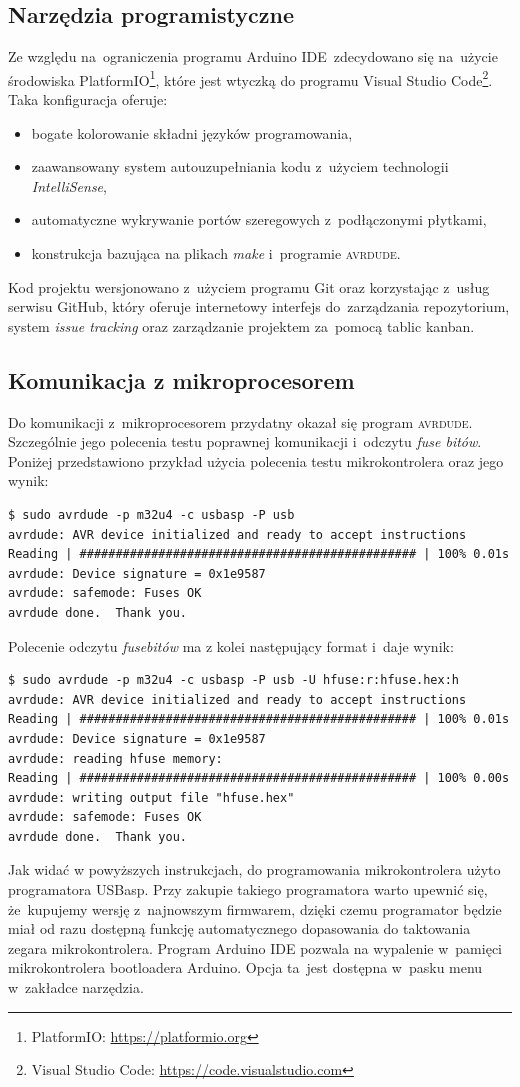\documentclass[11pt]{article}
\begin{document}
\subsection{Narzędzia programistyczne}
Ze względu na~ograniczenia programu Arduino IDE~zdecydowano się na~użycie środowiska PlatformIO\footnote{PlatformIO: \url{https://platformio.org}}, które jest wtyczką do programu Visual Studio Code\footnote{Visual Studio Code: \url{https://code.visualstudio.com}}. Taka konfiguracja oferuje:
\begin{itemize}
	\item bogate kolorowanie składni języków programowania,
	\item zaawansowany system autouzupełniania kodu z~użyciem technologii \textit{IntelliSense},
	\item automatyczne wykrywanie portów szeregowych z~podłączonymi płytkami,
	\item konstrukcja bazująca na plikach \textit{make} i~programie \textsc{avrdude}.
\end{itemize}
Kod projektu wersjonowano z~użyciem programu Git oraz korzystając z~usług serwisu GitHub, który oferuje internetowy interfejs do~zarządzania repozytorium, system \textit{issue tracking} oraz zarządzanie projektem za~pomocą tablic kanban.

\subsection{Komunikacja z mikroprocesorem}
Do komunikacji z~mikroprocesorem przydatny okazał się program \textsc{avrdude}.
Szczególnie jego polecenia testu poprawnej komunikacji i~odczytu \textit{fuse bitów}.
Poniżej przedstawiono przykład użycia polecenia testu mikrokontrolera oraz jego wynik:

\begin{verbatim}
$ sudo avrdude -p m32u4 -c usbasp -P usb
avrdude: AVR device initialized and ready to accept instructions
Reading | ############################################### | 100% 0.01s
avrdude: Device signature = 0x1e9587
avrdude: safemode: Fuses OK
avrdude done.  Thank you.
\end{verbatim}
Polecenie odczytu \textit{fusebitów} ma z kolei następujący format i~daje wynik:
\begin{verbatim}
$ sudo avrdude -p m32u4 -c usbasp -P usb -U hfuse:r:hfuse.hex:h
avrdude: AVR device initialized and ready to accept instructions
Reading | ############################################### | 100% 0.01s
avrdude: Device signature = 0x1e9587
avrdude: reading hfuse memory:
Reading | ############################################### | 100% 0.00s
avrdude: writing output file "hfuse.hex"
avrdude: safemode: Fuses OK
avrdude done.  Thank you.
\end{verbatim}
Jak widać w powyższych instrukcjach, do programowania mikrokontrolera użyto programatora USBasp.
Przy zakupie takiego programatora warto upewnić się, że~kupujemy wersję z~najnowszym firmwarem, dzięki czemu programator będzie miał od razu dostępną funkcję automatycznego dopasowania do taktowania zegara mikrokontrolera.
Program Arduino IDE pozwala na wypalenie w~pamięci mikrokontrolera bootloadera Arduino.
Opcja ta~jest dostępna w~pasku menu w~zakładce narzędzia.
\end{document}
